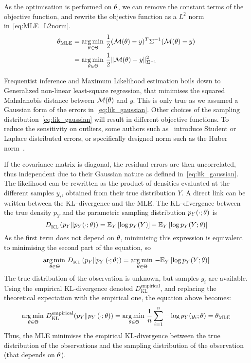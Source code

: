 \documentclass[../../Main_ManuscritThese.tex]{subfiles}
\begin{document}
  As the optimisation is performed on $\theta$, we can remove the
  constant terms of the objective function, and rewrite the objective
  function as a $L^2$ norm
  in~\cref{eq:MLE_L2norm}.  %
  \begin{align}
    {\theta}_{\mathrm{MLE}} &= \operatorname*{arg\,min \,}_{\theta \in \Theta}\frac{1}{2}(\mathcal{M}(\theta) - y)^T\Sigma^{-1}(\mathcal{M}(\theta) - y) \nonumber\\
                           &= \operatorname*{arg\,min \,}_{\theta \in \Theta}\frac12 \| \mathcal{M}(\theta) - y \|^2_{\Sigma^{-1}} \label{eq:MLE_L2norm}
  \end{align}

  Frequentist inference and Maximum Likelihood estimation boils down
  to Generalized non-linear least-square regression, that minimises
  the squared Mahalanobis distance between $\mathcal{M}({\theta})$ and
  $y$. This is only true as we assumed a Gaussian form of the errors
  in~\cref{eq:lik_gaussian}. Other choices of the sampling
  distribution~\cref{eq:lik_gaussian} will result in different
  objective functions. To reduce the sensitivity on outliers, some
  authors such as~\cite{rao_robust_2015} introduce Student or Laplace
  distributed errors, or specifically designed norm such as the Huber
  norm~\cite{huber_robust_2011}.

  If the covariance matrix is diagonal, the residual errors are then
  uncorrelated, thus independent due to their Gaussian nature as
  defined in~\cref{eq:lik_gaussian}. The likelihood can be rewritten
  as the product of densities evaluated at the different samples
  $y_i$, obtained from their true distribution $Y$.  A direct link can
  be written between the KL--divergence and the MLE. The
  KL--divergence between the true density $p_Y$ and the parametric
  sampling distribution $p_Y(\cdot;\theta)$ is
  \begin{equation}
  D^{\mathrm{}}_{\mathrm{KL}}\left(p_Y \| p_Y(\cdot;\theta)\right) = \mathbb{E}_Y\left[\log p_Y(Y)\right]-\mathbb{E}_Y\left[\log p_Y(Y;\theta)\right]  
\end{equation}
As the first term does not depend on $\theta$, minimising this expression
is equivalent to minimising the second part of the equation, so
\begin{align}
 \operatorname*{arg\,min \,}_{\theta \in\Theta} D^{\mathrm{}}_{\mathrm{KL}}\left(p_Y \| p_Y\left(\cdot;\theta \right)\right) = \operatorname*{arg\,min \,}_{\theta \in \Theta} -\mathbb{E}_{Y}\left[\log p_{Y}(Y ; \theta)\right]
\end{align}
The true distribution of the observation is unknown, but samples $y_i$
are available. Using the empirical KL-divergence denoted
$D^{\mathrm{empirical}}_{\mathrm{KL}}$, and replacing the theoretical
expectation with the empirical one, the equation above becomes:
\begin{equation}
  \operatorname*{arg\,min \,}_{\theta \in\Theta} D^{\mathrm{empirical}}_{\mathrm{KL}}(p_Y \| p_Y\left(\cdot;\theta \right)) = \operatorname*{arg\,min \,}_{\theta \in\Theta} \frac{1}{n} \sum_{i=1}^n - \log p_Y(y_i;\theta) = {\theta}_{\mathrm{MLE}}
\end{equation}
Thus, the MLE minimises the empirical KL-divergence between the true
distribution of the observations and the sampling distribution of the
observation (that depends on $\theta$).
\end{document}
